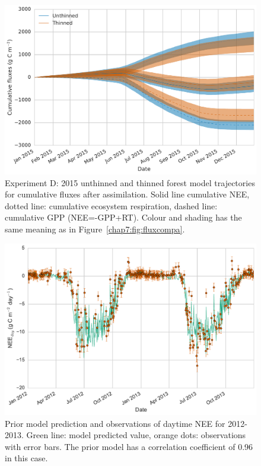   \begin{figure}
 \noindent\includegraphics[width=30pc]{chapter/chapter7/cum_fluxd.pdf}
\caption{Experiment D: 2015 unthinned and thinned forest model trajectories for cumulative fluxes after assimilation. Solid line cumulative NEE, dotted line: cumulative ecosystem respiration, dashed line: cumulative GPP (NEE=-GPP+RT). Colour and shading has the same meaning as in Figure~\ref{chap7:fig:fluxcompa}.}
 \label{chap7:fig:fluxcumd}
 \end{figure}
 
 
 \begin{figure}[ht]
 \noindent\includegraphics[width=30pc]{chapter/chapter7/prior.pdf}
    \caption{Prior model prediction and observations of daytime NEE for 2012-2013. Green line: model predicted value, orange dots: observations with error bars. The prior model has a correlation coefficient of 0.96 in this case.} 
    \label{chap7:fig:prior_mod}
\end{figure}


